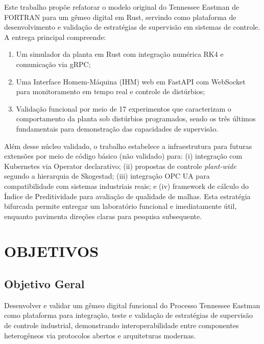 Este trabalho propõe refatorar o modelo original do Tennessee Eastman de FORTRAN para um gêmeo digital em Rust, servindo como plataforma de desenvolvimento e validação de estratégias de supervisão em sistemas de controle. A entrega principal compreende:

\begin{enumerate}
  \item Um simulador da planta em Rust com integração numérica RK4 e comunicação via gRPC;
  \item Uma Interface Homem-Máquina (IHM) web em FastAPI com WebSocket para monitoramento em tempo real e controle de distúrbios;
  \item Validação funcional por meio de 17 experimentos que caracterizam o comportamento da planta sob distúrbios programados, sendo os três últimos fundamentais para demonstração das capacidades de supervisão.
\end{enumerate}

Além desse núcleo validado, o trabalho estabelece a infraestrutura para futuras extensões por meio de código básico (não validado) para: (i) integração com Kubernetes via Operator declarativo; (ii) propostas de controle \textit{plant-wide} segundo a hierarquia de Skogestad; (iii) integração OPC UA para compatibilidade com sistemas industriais reais; e (iv) framework de cálculo do Índice de Preditividade para avaliação de qualidade de malhas. Esta estratégia bifurcada permite entregar um laboratório funcional e imediatamente útil, enquanto pavimenta direções claras para pesquisa subsequente.

\section{OBJETIVOS}
\label{sec:objetivos}

\subsection{Objetivo Geral}

Desenvolver e validar um gêmeo digital funcional do Processo Tennessee Eastman como plataforma para integração, teste e validação de estratégias de supervisão de controle industrial, demonstrando interoperabilidade entre componentes heterogêneos via protocolos abertos e arquiteturas modernas.

